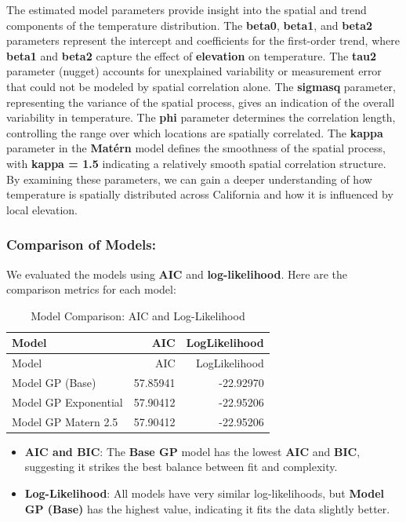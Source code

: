 \documentclass[
  11pt,
]{article}
\providecommand{\tightlist}{%
  \setlength{\itemsep}{0pt}\setlength{\parskip}{0pt}}\usepackage{longtable,booktabs,array}
\begin{document}
The estimated model parameters provide insight into the spatial and
trend components of the temperature distribution. The \textbf{beta0},
\textbf{beta1}, and \textbf{beta2} parameters represent the intercept
and coefficients for the first-order trend, where \textbf{beta1} and
\textbf{beta2} capture the effect of \textbf{elevation} on temperature.
The \textbf{tau2} parameter (nugget) accounts for unexplained
variability or measurement error that could not be modeled by spatial
correlation alone. The \textbf{sigmasq} parameter, representing the
variance of the spatial process, gives an indication of the overall
variability in temperature. The \textbf{phi} parameter determines the
correlation length, controlling the range over which locations are
spatially correlated. The \textbf{kappa} parameter in the
\textbf{Matérn} model defines the smoothness of the spatial process,
with \textbf{kappa = 1.5} indicating a relatively smooth spatial
correlation structure. By examining these parameters, we can gain a
deeper understanding of how temperature is spatially distributed across
California and how it is influenced by local elevation.

\subsubsection{Comparison of Models:}\label{comparison-of-models}

We evaluated the models using \textbf{AIC} and \textbf{log-likelihood}.
Here are the comparison metrics for each model:

\begin{longtable}[]{@{}lrr@{}}
\caption{Model Comparison: AIC and Log-Likelihood}\tabularnewline
\toprule\noalign{}
Model & AIC & LogLikelihood \\
\midrule\noalign{}
\endfirsthead
\toprule\noalign{}
Model & AIC & LogLikelihood \\
\midrule\noalign{}
\endhead
\bottomrule\noalign{}
\endlastfoot
Model GP (Base) & 57.85941 & -22.92970 \\
Model GP Exponential & 57.90412 & -22.95206 \\
Model GP Matern 2.5 & 57.90412 & -22.95206 \\
\end{longtable}

\begin{itemize}
\tightlist
\item
  \textbf{AIC and BIC}: The \textbf{Base GP} model has the lowest
  \textbf{AIC} and \textbf{BIC}, suggesting it strikes the best balance
  between fit and complexity.
\item
  \textbf{Log-Likelihood}: All models have very similar log-likelihoods,
  but \textbf{Model GP (Base)} has the highest value, indicating it fits
  the data slightly better.
\end{itemize}
\end{document}
